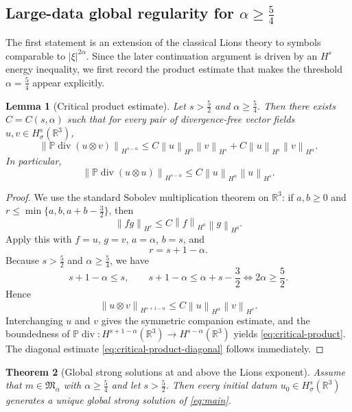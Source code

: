 \documentclass[11pt]{article}
\newtheorem{theorem}{Theorem}[section]
\newtheorem{lemma}[theorem]{Lemma}
\theoremstyle{definition}
\theoremstyle{remark}
\newcommand{\R}{\mathbb{R}}
\newcommand{\Pcal}{\mathbb{P}}
\newcommand{\norm}[1]{\left\lVert #1\right\rVert}
\newcommand{\diver}{\operatorname{div}}
\begin{document}
\subsection{Large-data global regularity for $\alpha\ge \frac54$}

The first statement is an extension of the classical Lions theory to symbols comparable to $|\xi|^{2\alpha}$. Since the later continuation argument is driven by an $H^s$ energy inequality, we first record the product estimate that makes the threshold $\alpha=\frac54$ appear explicitly.

\begin{lemma}[Critical product estimate]\label{lem:critical-product}
Let $s>\frac52$ and $\alpha\ge \frac54$. Then there exists $C=C(s,\alpha)$ such that for every pair of divergence-free vector fields $u,v\in H^s_\sigma(\R^3)$,
\begin{equation}\label{eq:critical-product}
\norm{\Pcal\diver(u\otimes v)}_{H^{s-\alpha}}
\le C\norm{u}_{H^\alpha}\norm{v}_{H^s} + C\norm{u}_{H^s}\norm{v}_{H^\alpha}.
\end{equation}
In particular,
\begin{equation}\label{eq:critical-product-diagonal}
\norm{\Pcal\diver(u\otimes u)}_{H^{s-\alpha}}
\le C\norm{u}_{H^\alpha}\norm{u}_{H^s}.
\end{equation}
\end{lemma}

\begin{proof}
We use the standard Sobolev multiplication theorem on $\R^3$: if $a,b\ge0$ and $r\le \min\{a,b,a+b-\frac32\}$, then
\[
\norm{fg}_{H^r}\le C\norm{f}_{H^a}\norm{g}_{H^b}.
\]
Apply this with $f=u$, $g=v$, $a=\alpha$, $b=s$, and
\[
r=s+1-\alpha.
\]
Because $s>\frac52$ and $\alpha\ge \frac54$, we have
\[
s+1-\alpha\le s,
\qquad
s+1-\alpha\le \alpha+s-\frac32
\iff 2\alpha\ge \frac52.
\]
Hence
\[
\norm{u\otimes v}_{H^{s+1-\alpha}}
\le C\norm{u}_{H^\alpha}\norm{v}_{H^s}.
\]
Interchanging $u$ and $v$ gives the symmetric companion estimate, and the boundedness of $\Pcal\diver: H^{s+1-\alpha}(\R^3)\to H^{s-\alpha}(\R^3)$ yields \eqref{eq:critical-product}. The diagonal estimate \eqref{eq:critical-product-diagonal} follows immediately.
\end{proof}

\begin{theorem}[Global strong solutions at and above the Lions exponent]\label{thm:lions}
Assume that $m\in\mathfrak M_\alpha$ with $\alpha\ge \frac54$ and let $s>\frac52$. Then every initial datum $u_0\in H^s_\sigma(\R^3)$ generates a unique global strong solution of \eqref{eq:main}.
\end{theorem}
\end{document}

